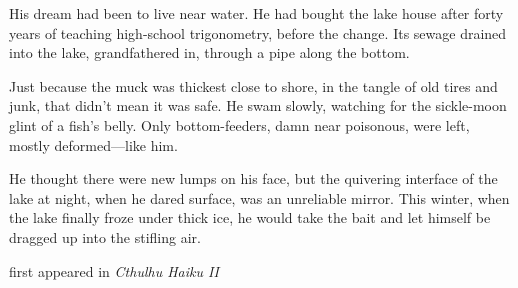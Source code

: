His dream had been to live near water. He had bought the lake house
after forty years of teaching high-school trigonometry, before the
change. Its sewage drained into the lake, grandfathered in, through a
pipe along the bottom.

Just because the muck was thickest close to shore, in the tangle of old
tires and junk, that didn't mean it was safe. He swam slowly, watching
for the sickle-moon glint of a fish's belly. Only bottom-feeders, damn
near poisonous, were left, mostly deformed---like him.

He thought there were new lumps on his face, but the quivering interface
of the lake at night, when he dared surface, was an unreliable mirror.
This winter, when the lake finally froze under thick ice, he would take
the bait and let himself be dragged up into the stifling air.

first appeared in \emph{Cthulhu Haiku II}
